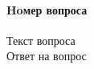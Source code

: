 \documentclass[__main__.tex]{subfiles}
\begin{document}
\paragraph{Hoмер вопроса}
Текст вопроса\\

Ответ на вопрос
\end{document}
